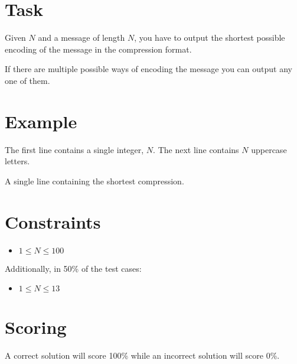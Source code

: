 \documentclass{saco}
\begin{document}
\section{Task}
Given $N$ and a message of length $N$, you have to output the shortest possible
encoding of the message in the compression format.

If there are multiple possible ways of encoding the message you can output any
one of them.

\section{Example}

The first line contains a single integer, $N$. The next line contains $N$
uppercase letters.

\sampleinput

\outputformat
A single line containing the shortest compression.

\sampleoutput

\section{Constraints}
\begin{itemize}
  \item $1 \leq N \leq 100$
\end{itemize}

Additionally, in 50\% of the test cases:
\begin{itemize}
  \item $1 \leq N \leq 13$
\end{itemize}

\timelimit

\feedback

\section{Scoring}
A correct solution will score 100\% while an incorrect solution will score
0\%.
\end{document}

